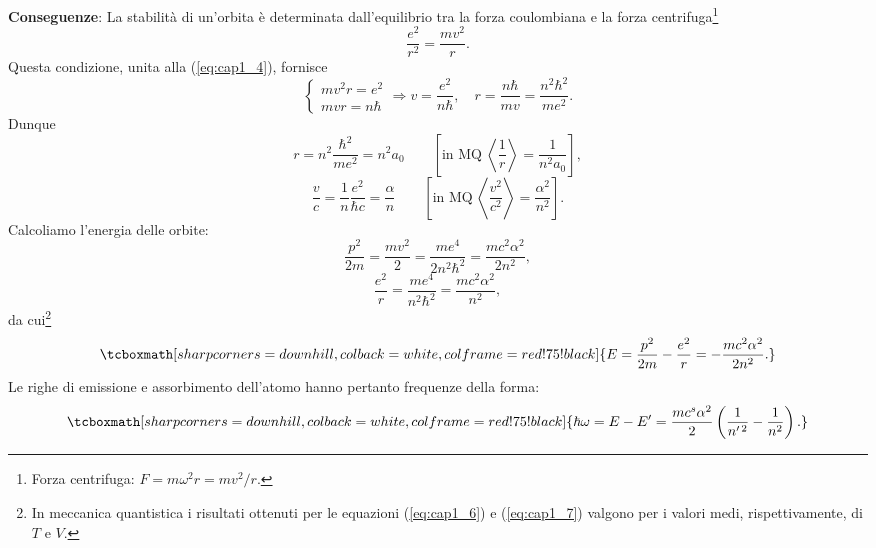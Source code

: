 \textbf{Conseguenze}:
La stabilità di un'orbita è determinata dall'equilibrio tra la forza coulombiana e la forza centrifuga\footnote{Forza centrifuga: $F= m\omega ^2 r = mv^2 /r$.}
	\begin{equation}
	\frac{e^2}{r^2}=\frac{mv^2}{r} .
	\end{equation}	
Questa condizione, unita alla (\ref{eq:cap1_4}), fornisce
	\begin{equation}
		\begin{cases}
		mv^2 r= e^2 \\
		mvr =n\hbar		
		\end{cases}
		\Rightarrow v=\frac{e^2}{n\hbar}, \quad r=\frac{n\hbar}{mv}=\frac{n^2 \hbar ^2}{me^2} .
	\end{equation}
Dunque
	\begin{equation}
	r=n^2 \frac{\hbar ^2}{me^2}= n^2 a_0 \qquad \left[\textrm{in MQ}\ \left\langle\frac{1}{r}\right\rangle = \frac{1}{n^2 a_0}\right],
	\end{equation}
		\begin{equation}
	\frac{v}{c}= \frac{1}{n}\frac{e^2}{\hbar c}=\frac{\alpha}{n} \qquad \left[\textrm{in MQ}\ \left\langle\frac{v^2}{c^2}\right\rangle = \frac{\alpha ^2}{n^2}\right].
	\end{equation}
Calcoliamo l'energia delle orbite:
	\begin{equation}
		\frac{p^2}{2m}= \frac{mv^2}{2} =\frac{me^4}{2n^2 \hbar ^2} =\frac{mc^2 \alpha ^2}{2n^2},
		\label{eq:cap1_6}
	\end{equation}
	\begin{equation}
		\frac{e^2}{r}= \frac{me^4}{n^2 \hbar^2} =\frac{mc^2 \alpha ^2}{n^2},
		\label{eq:cap1_7}
	\end{equation}
da cui\footnote{In meccanica quantistica i risultati ottenuti per le equazioni (\ref{eq:cap1_6}) e (\ref{eq:cap1_7}) valgono per i valori medi, rispettivamente, di $T$ e $V$.}
	\begin{equation}
		\tcboxmath[sharp corners=downhill ,colback=white,colframe=red!75!black]{
			E=\frac{p^2}{2m}-\frac{e^2}{r}=-\frac{mc^2\alpha ^2}{2n^2}. }
	\end{equation}
Le righe di emissione e assorbimento dell'atomo hanno pertanto frequenze della forma:
	\begin{equation}
		\tcboxmath[sharp corners=downhill ,colback=white,colframe=red!75!black]{
			\hbar \omega = E-E' =\frac{mc^s \alpha ^2}{2}\left(\frac{1}{n^{\prime \, 2}} - \frac{1}{n^2}\right).
			}
	\end{equation}
